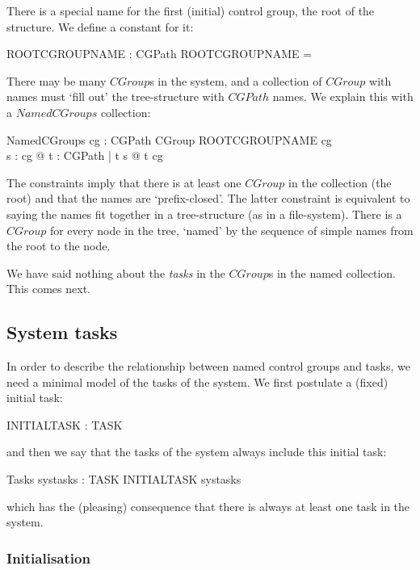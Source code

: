 \documentclass[a4paper,twoside,12pt]{article}
\begin{document}
There is a special name for the first (initial) control group, the root of the structure. We define a constant for it:

\begin{axdef}{}
ROOTCGROUPNAME : CGPath
\where
ROOTCGROUPNAME = \langle \rangle
\end{axdef}

There may be many $CGroup$s in the system, and a collection of $CGroup$ with names must `fill out' the tree-structure with $CGPath$ names. We explain this with a $NamedCGroups$ collection:

\begin{schema}{NamedCGroups}
cg : CGPath \ffun CGroup
\where
ROOTCGROUPNAME \in \dom cg \\
\forall s : \dom cg @ \forall t : CGPath | t \subset s @ t \in \dom cg
\end{schema}
The constraints imply that there is  at least one $CGroup$ in the collection (the root) and that the names are `prefix-closed'. The latter constraint is equivalent to saying the names fit together in a tree-structure (as in a file-system).
There is a $CGroup$ for every node in the tree, `named' by the sequence of simple names from the root to the node.

We have said nothing about the \emph{tasks} in the $CGroup$s in the named collection.
This comes next.

\subsection{System tasks}
In order to describe the relationship between named control groups and tasks, we need a minimal model of the tasks of the system. We first postulate a (fixed) initial task:

\begin{axdef}{}
INITIALTASK : TASK
\end{axdef}
and then we say that the tasks of the system always include this initial task:

\begin{schema}{Tasks}
systasks : \finset TASK
\where
INITIALTASK \in systasks
\end{schema}
which has the (pleasing) consequence that there is always at least one task in the system.

\subsubsection{Initialisation}
\end{document}
